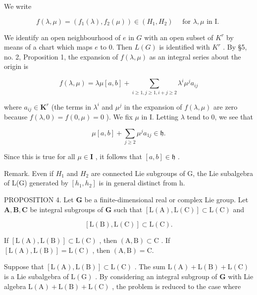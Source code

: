 We write

\[
f (\lambda , \mu) = (f _ {1} (\lambda), f _ {2} (\mu)) \in (H _ {1}, H _ {2}) \quad \text { for   } \lambda , \mu \text {   in   I. }
\]

We identify an open neighbourhood of \(e\) in \(G\) with an open subset of \(K^r\) by means of a chart which maps \(e\) to 0. Then \(L(G)\) is identified with \(K^r\) . By §5, no. 2, Proposition 1, the expansion of \(f(\lambda, \mu)\) as an integral series about the origin is

\[
f (\lambda , \mu) = \lambda \mu [ a, b ] + \sum_ {i \geqslant 1, j \geqslant 1, i + j \geqslant 2} \lambda^ {i} \mu^ {j} a _ {i j}
\]

where \(a_{ij} \in \mathbf{K}^r\) (the terms in \(\lambda^i\) and \(\mu^j\) in the expansion of \(f(\lambda, \mu)\) are zero because \(f(\lambda, 0) = f(0, \mu) = 0\) ). We fix \(\mu\) in I. Letting \(\lambda\) tend to 0, we see that

\[
\mu [ a, b ] + \sum_ {j \geqslant 2} \mu^ {j} a _ {1 j} \in \mathfrak {h}.
\]

Since this is true for all \(\mu\in\mathbf{I}\) , it follows that \([a,b]\in\mathfrak{h}\) .

Remark. Even if \(H_{1}\) and \(H_{2}\) are connected Lie subgroups of G, the Lie subalgebra of L(G) generated by \([h_{1}, h_{2}]\) is in general distinct from h.

PROPOSITION 4. Let \(\mathbf{G}\) be a finite-dimensional real or complex Lie group. Let \(\mathbf{A}, \mathbf{B}, \mathbf{C}\) be integral subgroups of \(\mathbf{G}\) such that \([\mathrm{L}(\mathrm{A}), \mathrm{L}(\mathrm{C})] \subset \mathrm{L}(\mathrm{C})\) and

\[
[ \mathrm{L} (\mathrm{B}), \mathrm{L} (\mathrm{C}) ] \subset \mathrm{L} (\mathrm{C}).
\]

If \([\mathrm{L}(\mathrm{A}),\mathrm{L}(\mathrm{B})]\subset \mathrm{L}(\mathrm{C})\) , then \((\mathrm{A},\mathrm{B})\subset \mathrm{C}\) . If \([\mathrm{L}(\mathrm{A}),\mathrm{L}(\mathrm{B})] = \mathrm{L}(\mathrm{C})\) , then \((\mathrm{A},\mathrm{B}) = \mathrm{C}\).

Suppose that \([\mathrm{L}(\mathrm{A}),\mathrm{L}(\mathrm{B})]\subset \mathrm{L}(\mathrm{C})\) . The sum \(\mathrm{L}(\mathrm{A}) + \mathrm{L}(\mathrm{B}) + \mathrm{L}(\mathrm{C})\) is a Lie subalgebra of \(\mathrm{L}(\mathrm{G})\) . By considering an integral subgroup of \(\mathbf{G}\) with Lie algebra \(\mathrm{L}(\mathrm{A}) + \mathrm{L}(\mathrm{B}) + \mathrm{L}(\mathrm{C})\) , the problem is reduced to the case where

